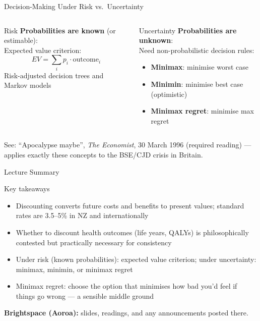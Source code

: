 \documentclass[aspectratio=169, 12pt]{beamer}
\newcommand{\summaryside}[1]{%
  \begin{frame}{Lecture Summary}
    \begin{exampleblock}{Key takeaways}
      \begin{itemize}#1\end{itemize}
    \end{exampleblock}
    \vspace{0.5em}
    {\footnotesize\textcolor{OtagoGold}{\textbf{Brightspace (Aoroa):}} slides, readings, and any announcements posted there.}
  \end{frame}}
\begin{document}
\begin{frame}{Decision-Making Under Risk vs.\ Uncertainty}
  \begin{columns}
      \begin{block}{Risk}
        \textbf{Probabilities are known} (or estimable):\\
        Expected value criterion:
        $$EV = \sum_i p_i \cdot \text{outcome}_i$$
        Risk-adjusted decision trees and Markov models
      \end{block}
      \begin{alertblock}{Uncertainty}
        \textbf{Probabilities are unknown}:\\
        Need non-probabilistic decision rules:
        \begin{itemize}
          \item \textbf{Minimax}: minimise worst case
          \item \textbf{Minimin}: minimise best case (optimistic)
          \item \textbf{Minimax regret}: minimise max regret
        \end{itemize}
      \end{alertblock}
  \end{columns}
  \vspace{0.4em}
  {\footnotesize See: ``Apocalypse maybe'', \textit{The Economist}, 30 March 1996 (required reading) --- applies exactly these concepts to the BSE/CJD crisis in Britain.}
\end{frame}

\summaryside{
  \item Discounting converts future costs and benefits to present values; standard rates are 3.5--5\% in NZ and internationally
  \item Whether to discount health outcomes (life years, QALYs) is philosophically contested but practically necessary for consistency
  \item Under risk (known probabilities): expected value criterion; under uncertainty: minimax, minimin, or minimax regret
  \item Minimax regret: choose the option that minimises how bad you'd feel if things go wrong --- a sensible middle ground
}

\end{document}
